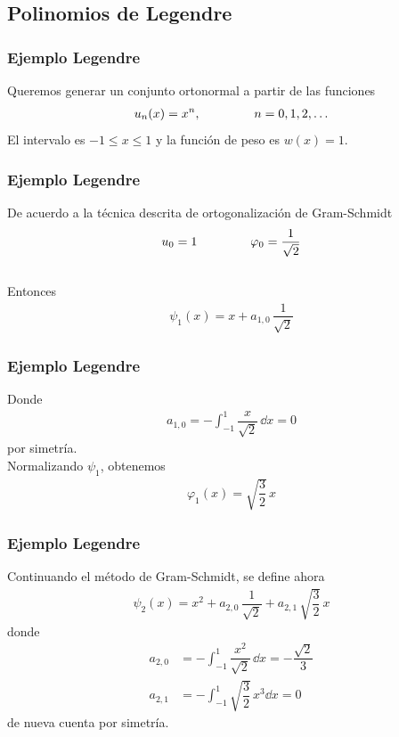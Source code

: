 \subsection{Polinomios de Legendre}
\begin{frame}
\frametitle{Ejemplo Legendre}
Queremos generar un conjunto ortonormal a partir de las funciones 
\begin{align*}
u_{n}(x) = x^{n}, \hspace{1.5cm} n = 0, 1, 2, \ldots
\end{align*}
El intervalo es $-1 \leq x \leq 1$ y la función de peso es $w(x)=1$.
\end{frame}
\begin{frame}
\frametitle{Ejemplo Legendre}
De acuerdo a la técnica descrita de ortogonalización de Gram-Schmidt
\begin{align}
u_{0} = 1 \hspace{1.5cm} \varphi_{0} =  \dfrac{1}{\sqrt{2}}
\label{eq:ecuacion_10_50}
\end{align}
\\
\bigskip
\pause
Entonces
\begin{align}
\psi_{1}(x) = x + a_{1,0} \, \dfrac{1}{\sqrt{2}}
\label{eq:ecuacion_10_51}
\end{align}
\end{frame}
\begin{frame}
\frametitle{Ejemplo Legendre}
Donde
\begin{align}
a_{1, 0} = - \int_{-1}^{1} \dfrac{x}{\sqrt{2}} \, \dd{x} = 0
\label{eq:ecuacion_10_52}
\end{align}
por simetría.
\\
\bigskip
\pause
Normalizando $\psi_{1}$, obtenemos
\begin{align}
\varphi_{1}(x) = \sqrt{\dfrac{3}{2}} \, x
\label{eq:ecuacion_10_53}
\end{align}
\end{frame}
\begin{frame}
\frametitle{Ejemplo Legendre}
Continuando el método de Gram-Schmidt, se define ahora
\begin{align}
\psi_{2} (x) = x^{2} +  a_{2, 0} \, \dfrac{1}{\sqrt{2}} +  a_{2, 1} \, \sqrt{\dfrac{3}{2}} \, x
\label{eq:ecuacion_10_54}
\end{align}
donde
\begin{align}
a_{2, 0} &= - \int_{-1}^{1} \dfrac{x^{2}}{\sqrt{2}} \, \dd{x} = - \dfrac{\sqrt{2}}{3} \label{eq:ecuacion_10_55} \\[1em] 
a_{2, 1} &= - \int_{-1}^{1} \sqrt{\dfrac{3}{2}} \, x^{3} \dd{x} = 0 \label{eq:ecuacion_10_56}
\end{align}
de nueva cuenta por simetría.
\end{frame}

